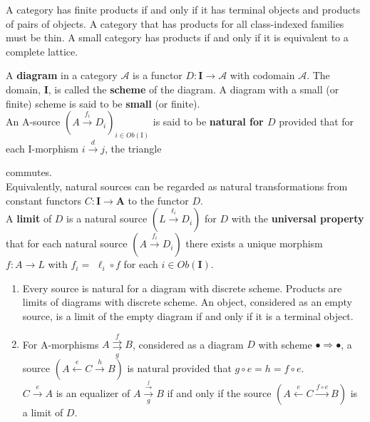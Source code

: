 \begin{example}
\begin{prop}
    A category has finite products if and only if it has terminal objects and products of pairs of objects.
    A category that has products for all class-indexed families must be thin.
A small category has products if and only if it is equivalent to a complete lattice.
\end{prop}

A \textbf{diagram} in a category $\mathcal{A}$ is a functor $D: \mathbf{I} \rightarrow \mathcal{A}$ with codomain $\mathcal{A}$. The domain, $\mathbf{I}$, is called the \textbf{scheme} of the diagram. A diagram with a small (or finite) scheme is said to be \textbf{small} (or finite).\\
An A-source $\left(A \xrightarrow{f_i} D_i\right)_{i \in O b(\mathrm{I})}$ is said to be \textbf{natural for $D$} provided that for each I-morphism $i \xrightarrow{d} j$, the triangle 
 commutes.\\
Equivalently, natural sources can be regarded as natural transformations from constant functors $C: \mathbf{I} \rightarrow \mathbf{A}$ to the functor $D$.\\
A \textbf{limit} of $D$ is a natural source $\left(L \xrightarrow{\ell_i} D_i\right)$ for $D$ with the \textbf{universal property} that for each natural source $\left(A \xrightarrow{f_i} D_i\right)$ there exists a unique morphism $f: A \rightarrow L$ with $f_i=$ $\ell_i \circ f$ for each $i \in O b(\mathbf{I})$.

\begin{enumerate}
    \item Every source is natural for a diagram with discrete scheme. Products are limits of diagrams with discrete scheme. An object, considered as an empty source, is a limit of the empty diagram if and only if it is a terminal object.

    \item For A-morphisms $A \underset{g}{\stackrel{f}{\rightrightarrows}} B$, considered as a diagram $D$ with scheme $\bullet \Rightarrow \bullet$, a source $(A \stackrel{e}{\longleftarrow} C \xrightarrow{h} B)$ is natural provided that $g \circ e=h=f \circ e$.\\
    $C \xrightarrow{e} A$ is an equalizer of $A \xrightarrow[g]{\stackrel{f}{\longrightarrow}} B$ if and only if the source $(A \stackrel{e}{\leftarrow} C \xrightarrow{f \circ e} B)$ is a limit of $D$. 


\end{enumerate}
\end{example}
